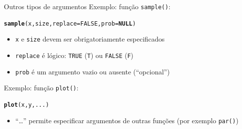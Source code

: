 \documentclass[10pt,handout]{beamer}\usepackage[]{graphicx}\usepackage[]{color}
\makeatletter
\newcommand{\hlnum}[1]{\textcolor[rgb]{0.686,0.059,0.569}{#1}}%
\newcommand{\hlstd}[1]{\textcolor[rgb]{0.345,0.345,0.345}{#1}}%
\newcommand{\hlkwa}[1]{\textcolor[rgb]{0.161,0.373,0.58}{\textbf{#1}}}%
\newcommand{\hlkwc}[1]{\textcolor[rgb]{0.333,0.667,0.333}{#1}}%
\newcommand{\hlkwd}[1]{\textcolor[rgb]{0.737,0.353,0.396}{\textbf{#1}}}%
\newenvironment{kframe}{%
 \def\at@end@of@kframe{}%
 \ifinner\ifhmode%
  \def\at@end@of@kframe{\end{minipage}}%
  \begin{minipage}{\columnwidth}%
 \fi\fi%
 \def\FrameCommand##1{\hskip\@totalleftmargin \hskip-\fboxsep
 \colorbox{shadecolor}{##1}\hskip-\fboxsep
     \hskip-\linewidth \hskip-\@totalleftmargin \hskip\columnwidth}%
 \MakeFramed {\advance\hsize-\width
   \@totalleftmargin\z@ \linewidth\hsize
   \@setminipage}}%
 {\par\unskip\endMakeFramed%
 \at@end@of@kframe}
\newenvironment{knitrout}{}{} %
\makeatother
\begin{document}
\begin{frame}[fragile]{Outros tipos de argumentos}
Exemplo: função \verb|sample()|:
\begin{knitrout}\small
{}\color{fgcolor}\begin{kframe}
\begin{alltt}
\hlkwd{sample}\hlstd{(x, size,} \hlkwc{replace} \hlstd{=} \hlnum{FALSE}\hlstd{,} \hlkwc{prob} \hlstd{=} \hlkwa{NULL}\hlstd{)}
\end{alltt}
\end{kframe}
\end{knitrout}
\begin{itemize}
\item \verb|x| e \verb|size| devem ser obrigatoriamente especificados
\item \verb|replace| é lógico: \verb|TRUE| (\verb|T|) ou \verb|FALSE|
  (\verb|F|)
\item \verb|prob| é um argumento vazio ou ausente (``opcional'')
\end{itemize}
Exemplo: função \verb|plot()|:
\begin{knitrout}\small
{}\color{fgcolor}\begin{kframe}
\begin{alltt}
\hlkwd{plot}\hlstd{(x, y, ...)}
\end{alltt}
\end{kframe}
\end{knitrout}
\begin{itemize}
\item ``\ldots'' permite especificar argumentos de outras funções (por
  exemplo \verb|par()|)
\end{itemize}
\end{frame}
\end{document}
